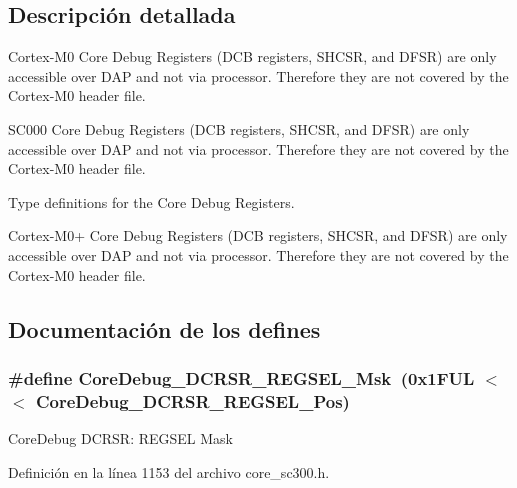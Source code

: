 \subsection{Descripción detallada}
Cortex-\/\+M0 Core Debug Registers (D\+CB registers, S\+H\+C\+SR, and D\+F\+SR) are only accessible over D\+AP and not via processor. Therefore they are not covered by the Cortex-\/\+M0 header file. 

S\+C000 Core Debug Registers (D\+CB registers, S\+H\+C\+SR, and D\+F\+SR) are only accessible over D\+AP and not via processor. Therefore they are not covered by the Cortex-\/\+M0 header file.

Type definitions for the Core Debug Registers.

Cortex-\/\+M0+ Core Debug Registers (D\+CB registers, S\+H\+C\+SR, and D\+F\+SR) are only accessible over D\+AP and not via processor. Therefore they are not covered by the Cortex-\/\+M0 header file.

\subsection{Documentación de los \textquotesingle{}defines\textquotesingle{}}
\subsubsection[{\texorpdfstring{Core\+Debug\+\_\+\+D\+C\+R\+S\+R\+\_\+\+R\+E\+G\+S\+E\+L\+\_\+\+Msk}{CoreDebug_DCRSR_REGSEL_Msk}}]{\setlength{\rightskip}{0pt plus 5cm}\#define Core\+Debug\+\_\+\+D\+C\+R\+S\+R\+\_\+\+R\+E\+G\+S\+E\+L\+\_\+\+Msk~(0x1\+F\+U\+L $<$$<$ Core\+Debug\+\_\+\+D\+C\+R\+S\+R\+\_\+\+R\+E\+G\+S\+E\+L\+\_\+\+Pos)}\hypertarget{group___c_m_s_i_s___core_debug_ga17cafbd72b55030219ce5609baa7c01d}{}\label{group___c_m_s_i_s___core_debug_ga17cafbd72b55030219ce5609baa7c01d}
Core\+Debug D\+C\+R\+SR\+: R\+E\+G\+S\+EL Mask 

Definición en la línea 1153 del archivo core\+\_\+sc300.\+h.

